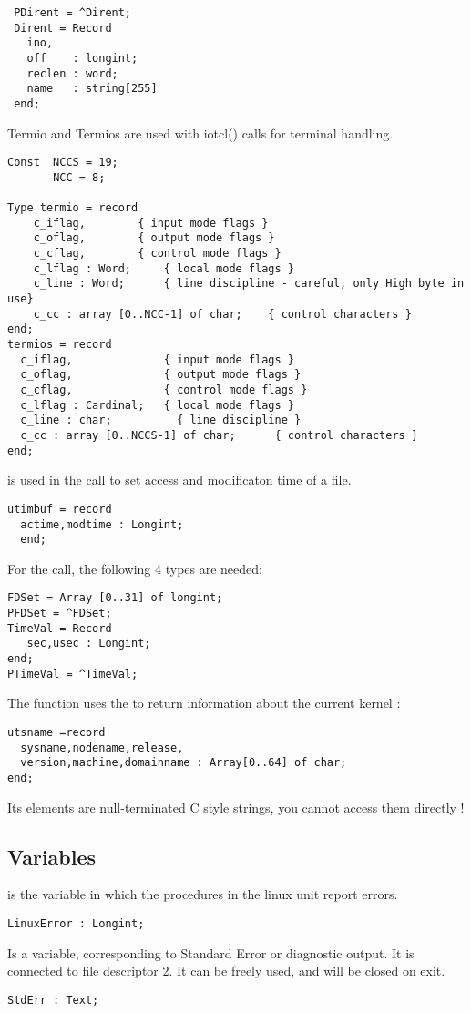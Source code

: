\begin{verbatim}
 PDirent = ^Dirent;
 Dirent = Record  
   ino,
   off    : longint;
   reclen : word;
   name   : string[255]
 end; 
\end{verbatim}
Termio and Termios are used with iotcl() calls for terminal handling.
\begin{verbatim}
Const  NCCS = 19;
       NCC = 8;
         
Type termio = record
	c_iflag,		{ input mode flags }
	c_oflag,		{ output mode flags }
	c_cflag,		{ control mode flags }
	c_lflag : Word;		{ local mode flags }
	c_line : Word;		{ line discipline - careful, only High byte in use}
	c_cc : array [0..NCC-1] of char;	{ control characters }
end;
termios = record
  c_iflag,              { input mode flags }
  c_oflag,              { output mode flags }
  c_cflag,              { control mode flags }
  c_lflag : Cardinal;	{ local mode flags }
  c_line : char;          { line discipline }
  c_cc : array [0..NCCS-1] of char;      { control characters }
end;
\end{verbatim}
 is used in the  call to set access and modificaton time
of a file.
\begin{verbatim}
utimbuf = record
  actime,modtime : Longint;
  end;
\end{verbatim}
For the  call, the following 4 types are needed:
\begin{verbatim}
FDSet = Array [0..31] of longint;
PFDSet = ^FDSet;
TimeVal = Record
   sec,usec : Longint;
end;
PTimeVal = ^TimeVal;
\end{verbatim}
The  function uses the  to return information about
the current kernel :
\begin{verbatim}
utsname =record
  sysname,nodename,release,
  version,machine,domainname : Array[0..64] of char;
end;
\end{verbatim}
Its elements are null-terminated C style strings, you cannot access them
directly !
\subsection{Variables}
 is the variable in which the procedures in the linux unit
report errors.
\begin{verbatim}
LinuxError : Longint;
\end{verbatim}
 Is a  variable, corresponding to Standard Error or
diagnostic output. It is connected to file descriptor 2. It can be freely
used, and will be closed on exit.
\begin{verbatim}
StdErr : Text;
\end{verbatim}
